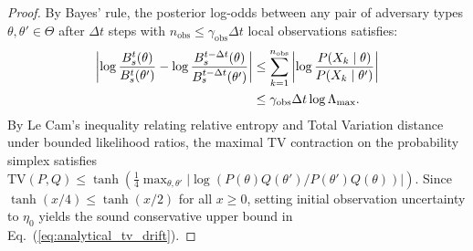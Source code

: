 \documentclass[lettersize,journal]{IEEEtran}
\begin{document}
\begin{proof}
By Bayes' rule, the posterior log-odds between any pair of adversary types $\theta, \theta' \in \Theta$ after $\Delta t$ steps with $n_{\text{obs}} \le \gamma_{\text{obs}} \Delta t$ local observations satisfies:
\begin{align}
    \left| \log \frac{B_s^t(\theta)}{B_s^t(\theta')} - \log \frac{B_s^{t-\Delta t}(\theta)}{B_s^{t-\Delta t}(\theta')} \right| &\le \sum_{k=1}^{n_{\text{obs}}} \left| \log \frac{P(X_k \mid \theta)}{P(X_k \mid \theta')} \right| \notag \\
    &\le \gamma_{\text{obs}} \Delta t \log \Lambda_{\max}.
\end{align}
By Le Cam's inequality relating relative entropy and Total Variation distance under bounded likelihood ratios, the maximal TV contraction on the probability simplex satisfies $\mathrm{TV}(P, Q) \le \tanh(\frac{1}{4} \max_{\theta,\theta'} |\log (P(\theta)Q(\theta') / P(\theta')Q(\theta))|)$. Since $\tanh(x/4) \le \tanh(x/2)$ for all $x \ge 0$, setting initial observation uncertainty to $\eta_0$ yields the sound conservative upper bound in Eq.~(\ref{eq:analytical_tv_drift}).
\end{proof}
\end{document}
